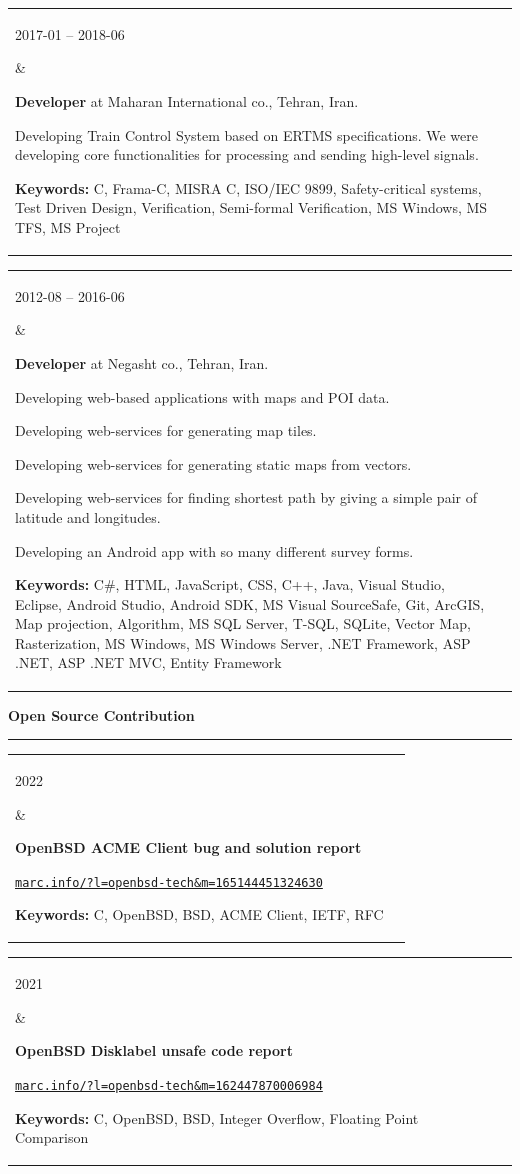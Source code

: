 \documentclass[11pt,a4paper,oneside]{article}
\makeatletter
\newcommand{\https}[1]{\href{https://#1}{\nolinkurl{#1}}}
\newcommand{\keywords}[1]{\textbf{Keywords:} #1}
\renewcommand{\section}[1]{%
{\large\textbf{#1}}\\
\rule[9pt]{18cm}{.4pt}\vspace{-16pt}%
}
\newenvironment{mytable}{%
\begin{tabular}{@{}l@{\hspace{4mm}}l@{}}%
}{\end{tabular}}
\newcommand{\myitem}[2]{%
\parbox[t]{16mm}{#1}&\parbox[t]{16cm}{#2}\\%
}
\makeatother
\begin{document}
\begin{mytable}
\myitem{2017-01 -- 2018-06}{
\textbf{Developer} at
Maharan International co., Tehran, Iran.

Developing Train Control System based on ERTMS specifications.
We were developing core functionalities for processing and
sending high-level signals.

\keywords{%
	C, Frama-C, MISRA C, ISO/IEC 9899, Safety-critical systems,
	Test Driven Design, Verification, Semi-formal Verification,
	MS Windows, MS TFS, MS Project
}
}
\end{mytable}

\begin{mytable}
\myitem{2012-08 -- 2016-06}{
\textbf{Developer} at
Negasht co., Tehran, Iran.

Developing web-based applications with maps and POI data.

Developing web-services for generating map tiles.

Developing web-services for generating static maps from vectors.

Developing web-services for finding shortest path by giving a
simple pair of latitude and longitudes.

Developing an Android app with so many different survey forms.

\keywords{%
	C\#, HTML, JavaScript, CSS, C++, Java, Visual Studio, Eclipse,
	Android Studio, Android SDK, MS Visual SourceSafe, Git, ArcGIS,
	Map projection, Algorithm, MS SQL Server, T-SQL, SQLite,
	Vector Map, Rasterization, MS Windows, MS Windows Server,
	.NET Framework, ASP .NET, ASP .NET MVC, Entity Framework
}
}
\end{mytable}

\section{Open Source Contribution}

\begin{mytable}
\myitem{2022}{%
\textbf{OpenBSD ACME Client bug and solution report}

\https{marc.info/?l=openbsd-tech&m=165144451324630}

\keywords{C, OpenBSD, BSD, ACME Client, IETF, RFC}
}
\end{mytable}

\begin{mytable}
\myitem{2021}{%
\textbf{OpenBSD Disklabel unsafe code report}

\https{marc.info/?l=openbsd-tech&m=162447870006984}

\keywords{C, OpenBSD, BSD, Integer Overflow, Floating Point Comparison}
}
\end{mytable}
\end{document}
